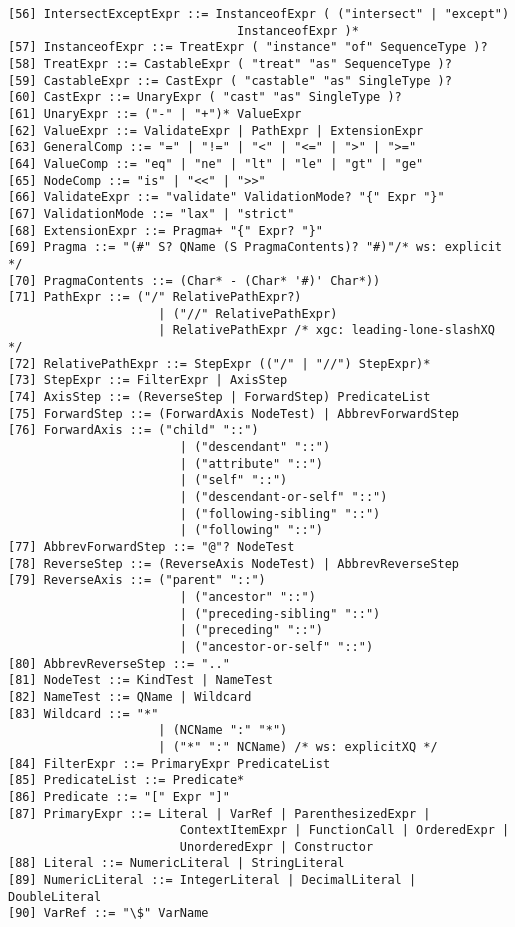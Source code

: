\begin{verbatim}
[56] IntersectExceptExpr ::= InstanceofExpr ( ("intersect" | "except")
                                InstanceofExpr )*
[57] InstanceofExpr ::= TreatExpr ( "instance" "of" SequenceType )?
[58] TreatExpr ::= CastableExpr ( "treat" "as" SequenceType )?
[59] CastableExpr ::= CastExpr ( "castable" "as" SingleType )?
[60] CastExpr ::= UnaryExpr ( "cast" "as" SingleType )?
[61] UnaryExpr ::= ("-" | "+")* ValueExpr
[62] ValueExpr ::= ValidateExpr | PathExpr | ExtensionExpr
[63] GeneralComp ::= "=" | "!=" | "<" | "<=" | ">" | ">="
[64] ValueComp ::= "eq" | "ne" | "lt" | "le" | "gt" | "ge"
[65] NodeComp ::= "is" | "<<" | ">>"
[66] ValidateExpr ::= "validate" ValidationMode? "{" Expr "}"
[67] ValidationMode ::= "lax" | "strict"
[68] ExtensionExpr ::= Pragma+ "{" Expr? "}"
[69] Pragma ::= "(#" S? QName (S PragmaContents)? "#)"/* ws: explicit */
[70] PragmaContents ::= (Char* - (Char* '#)' Char*))
[71] PathExpr ::= ("/" RelativePathExpr?)
                     | ("//" RelativePathExpr)
                     | RelativePathExpr /* xgc: leading-lone-slashXQ */
[72] RelativePathExpr ::= StepExpr (("/" | "//") StepExpr)*
[73] StepExpr ::= FilterExpr | AxisStep
[74] AxisStep ::= (ReverseStep | ForwardStep) PredicateList
[75] ForwardStep ::= (ForwardAxis NodeTest) | AbbrevForwardStep
[76] ForwardAxis ::= ("child" "::")
                        | ("descendant" "::")
                        | ("attribute" "::")
                        | ("self" "::")  
                        | ("descendant-or-self" "::")
                        | ("following-sibling" "::")
                        | ("following" "::")
[77] AbbrevForwardStep ::= "@"? NodeTest
[78] ReverseStep ::= (ReverseAxis NodeTest) | AbbrevReverseStep
[79] ReverseAxis ::= ("parent" "::")
                        | ("ancestor" "::")
                        | ("preceding-sibling" "::")
                        | ("preceding" "::")
                        | ("ancestor-or-self" "::")
[80] AbbrevReverseStep ::= ".."
[81] NodeTest ::= KindTest | NameTest
[82] NameTest ::= QName | Wildcard
[83] Wildcard ::= "*"
                     | (NCName ":" "*")
                     | ("*" ":" NCName) /* ws: explicitXQ */
[84] FilterExpr ::= PrimaryExpr PredicateList
[85] PredicateList ::= Predicate*
[86] Predicate ::= "[" Expr "]"
[87] PrimaryExpr ::= Literal | VarRef | ParenthesizedExpr |
                        ContextItemExpr | FunctionCall | OrderedExpr |
                        UnorderedExpr | Constructor 
[88] Literal ::= NumericLiteral | StringLiteral
[89] NumericLiteral ::= IntegerLiteral | DecimalLiteral | DoubleLiteral
[90] VarRef ::= "\$" VarName

\end{verbatim}
